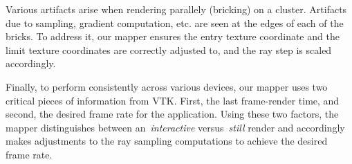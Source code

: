 Various artifacts arise when rendering parallely (bricking) on a cluster.
Artifacts due to sampling, gradient computation, etc.  are seen at the edges of
each of the bricks.  To address it, our mapper ensures the entry texture
coordinate and the limit texture coordinates are correctly adjusted to, and the
ray step is scaled accordingly.

Finally, to perform consistently across various devices, our mapper uses two
critical pieces of information from VTK. First, the last frame-render time, and
second, the desired frame rate for the application. Using these two factors, the
mapper distinguishes between an~\textit{interactive} versus~\textit{still}
render and accordingly makes adjustments to the ray sampling computations to
achieve the desired frame rate. 
